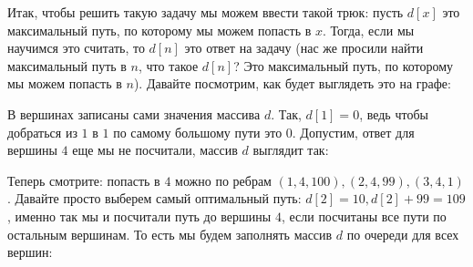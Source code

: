 \documentclass{article}
\begin{document}
Итак, чтобы решить такую задачу мы можем ввести такой трюк: пусть $d[x]$ это максимальный путь, по которому мы можем попасть в $x$. Тогда, если мы научимся это считать, то $d[n]$ это ответ на задачу (нас же просили найти максимальный путь в $n$, что такое $d[n]$? Это максимальный путь, по которому мы можем попасть в $n$). Давайте посмотрим, как будет выглядеть это на графе:

\begin{center}
    \end{center}
В вершинах записаны сами значения массива $d$. Так, $d[1] = 0$, ведь чтобы добраться из $1$ в $1$ по самому большому пути это $0$. Допустим, ответ для вершины $4$ еще мы не посчитали, массив $d$ выглядит так:

\begin{center}
    \end{center}
Теперь смотрите: попасть в $4$ можно по ребрам $(1,4,100), (2, 4, 99), (3, 4, 1)$. 
Давайте просто выберем самый оптимальный путь: $d[2] = 10, d[2] + 99 = 109$, именно так мы и посчитали путь до вершины $4$, если посчитаны все пути по остальным вершинам. То есть мы будем заполнять массив $d$ по очереди для всех вершин:
\end{document}

